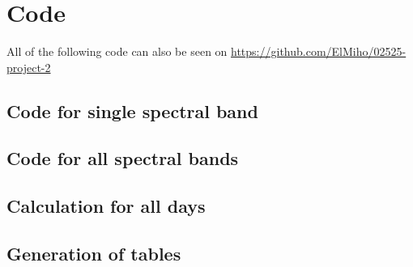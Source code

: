 \documentclass{article}
\begin{document}
\newpage
\appendix
\section{Code}
All of the following code can also be seen on \url{https://github.com/ElMiho/02525-project-2}
\subsection{Code for single spectral band}


\subsection{Code for all spectral bands}


\subsection{Calculation for all days}


\subsection{Generation of tables}

\end{document}
